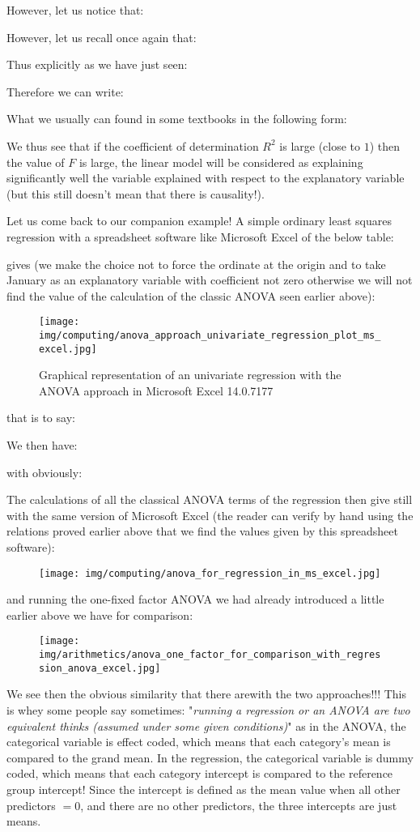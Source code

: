 	However, let us notice that:
	
	However, let us recall once again that:
	
 	Thus explicitly as we have just seen:
	
	Therefore we can write:
	
	What we usually can found in some textbooks in the following form:
	
	We thus see that if the coefficient of determination $R^2$ is large (close to $1$) then the value of $F$ is large, the linear model will be considered as explaining significantly well the variable explained with respect to the explanatory variable (but this still doesn't mean that there is causality!).
	
	Let us come back to our companion example! A simple ordinary least squares regression with a spreadsheet software like Microsoft Excel of the below table:
	
	gives (we make the choice not to force the ordinate at the origin and to take January as an explanatory variable with coefficient not zero otherwise we will not find the value of the calculation of the classic ANOVA seen earlier above):
	\begin{figure}[H]
		\centering
		\texttt{[image: img/computing/anova\_approach\_univariate\_regression\_plot\_ms\_excel.jpg]}
		\caption{Graphical representation of an univariate regression with the ANOVA approach in Microsoft Excel 14.0.7177}
	\end{figure}
	that is to say:
	
	We then have:
		
	with obviously:
	
	The calculations of all the classical ANOVA terms of the regression then give still with the same version of Microsoft Excel (the reader can verify by hand using the relations proved earlier above that we find the values given by this spreadsheet software):
	\begin{figure}[H]
		\centering
		\texttt{[image: img/computing/anova\_for\_regression\_in\_ms\_excel.jpg]}
	\end{figure}
	and running the one-fixed factor ANOVA we had already introduced a little earlier above we have for comparison:
	\begin{figure}[H]
		\centering
		\texttt{[image: img/arithmetics/anova\_one\_factor\_for\_comparison\_with\_regression\_anova\_excel.jpg]}
	\end{figure}
	We see then the obvious similarity that there  arewith the two approaches!!! This is whey some people say sometimes: "\textit{running a regression or an ANOVA are two equivalent thinks (assumed under some given conditions)}" as in the ANOVA, the categorical variable is effect coded, which means that each category's mean is compared to the grand mean. In the regression, the categorical variable is dummy coded, which means that each category intercept is compared to the reference group intercept! Since the intercept is defined as the mean value when all other predictors $= 0$, and there are no other predictors, the three intercepts are just means.
	
